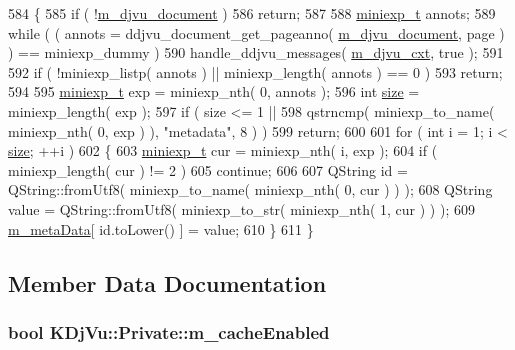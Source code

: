 \begin{DoxyCode}
584 \{
585     \textcolor{keywordflow}{if} ( !\hyperlink{classKDjVu_1_1Private_a183f9508738c71bb5abab150619a5ccd}{m\_djvu\_document} )
586         \textcolor{keywordflow}{return};
587 
588     \hyperlink{kdjvu_8h_a58955b1a7edfc6e6ccb48402f744802b}{miniexp\_t} annots;
589     \textcolor{keywordflow}{while} ( ( annots = ddjvu\_document\_get\_pageanno( \hyperlink{classKDjVu_1_1Private_a183f9508738c71bb5abab150619a5ccd}{m\_djvu\_document}, page ) ) == 
      miniexp\_dummy )
590         handle\_ddjvu\_messages( \hyperlink{classKDjVu_1_1Private_a5a52150a7ab9bbd584d6d73d68ae9ba1}{m\_djvu\_cxt}, \textcolor{keyword}{true} );
591 
592     \textcolor{keywordflow}{if} ( !miniexp\_listp( annots ) || miniexp\_length( annots ) == 0 )
593         \textcolor{keywordflow}{return};
594 
595     \hyperlink{kdjvu_8h_a58955b1a7edfc6e6ccb48402f744802b}{miniexp\_t} exp = miniexp\_nth( 0, annots );
596     \textcolor{keywordtype}{int} \hyperlink{synctex__parser_8c_aa23c661441688350614bd6a350d2b6ff}{size} = miniexp\_length( exp );
597     \textcolor{keywordflow}{if} ( size <= 1 ||
598          qstrncmp( miniexp\_to\_name( miniexp\_nth( 0, exp ) ), \textcolor{stringliteral}{"metadata"}, 8 ) )
599         \textcolor{keywordflow}{return};
600 
601     \textcolor{keywordflow}{for} ( \textcolor{keywordtype}{int} i = 1; i < \hyperlink{synctex__parser_8c_aa23c661441688350614bd6a350d2b6ff}{size}; ++i )
602     \{
603         \hyperlink{kdjvu_8h_a58955b1a7edfc6e6ccb48402f744802b}{miniexp\_t} cur = miniexp\_nth( i, exp );
604         \textcolor{keywordflow}{if} ( miniexp\_length( cur ) != 2 )
605             \textcolor{keywordflow}{continue};
606 
607         QString \textcolor{keywordtype}{id} = QString::fromUtf8( miniexp\_to\_name( miniexp\_nth( 0, cur ) ) );
608         QString value = QString::fromUtf8( miniexp\_to\_str( miniexp\_nth( 1, cur ) ) );
609         \hyperlink{classKDjVu_1_1Private_a48e70e9e1d6e964cacaf5bc8295dcba7}{m\_metaData}[ \textcolor{keywordtype}{id}.toLower() ] = value;
610     \}
611 \}
\end{DoxyCode}


\subsection{Member Data Documentation}
\hypertarget{classKDjVu_1_1Private_a61eaa61e0d4e31a7e411a481df9827ee}{
\subsubsection[{m\+\_\+cache\+Enabled}]{\setlength{\rightskip}{0pt plus 5cm}bool K\+Dj\+Vu\+::\+Private\+::m\+\_\+cache\+Enabled}}\label{classKDjVu_1_1Private_a61eaa61e0d4e31a7e411a481df9827ee}


